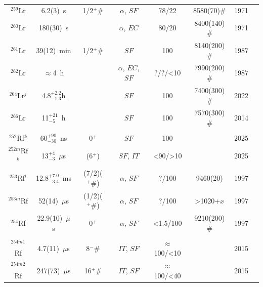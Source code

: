 \begin{center}
\begin{longtable}{c|ccccccl}
$^{259}$Lr	& 6.2(3)~s		& 1/2$^+ \#$&$\alpha$, $SF$		&78/22		& 8580(70)$\#$		&1971	&{\tiny\cite{EskolaK1971,Gregorich1992,HamiltonT1992,Holden2000,Asai2010a,Haba2020}}\\
$^{260}$Lr	& 180(30)~s		& 			&$\alpha$, $EC$		&80/20	    & 8400(140)$\#$	    &1971	&{\tiny\cite{EskolaK1971}}\\
$^{261}$Lr	& 39(12)~min	& 1/2$^+ \#$&$SF$				&100		& 8140(200)$\#$	    &1987	&{\tiny\cite{Lougheed1987,Hulet1989a,Henderson1991}}\\
$^{262}$Lr	& $\approx$4~h	& 			&$\alpha$, $EC$, $SF$	&?/?/<10& 7990(200)$\#$	    &1987	&{\tiny\cite{Lougheed1987,Hulet1989a,Devaraja2019}}\\
$^{264}$Lr$^j$	&4.8$^{+2.2}_{-1.3}$h& 	&$SF$				&100		& 7400(300)$\#$	    &2022	&{\tiny\cite{Oganessian2022c,Oganessian2022d}}\\
$^{266}$Lr	& 11$^{+21}_{-5}$~h	& 		&$SF$				&100		& 7570(300)$\#$	    &2014	&{\tiny\cite{Khuyagbaatar2014,Devaraja2019,Khuyagbaatar2019}}\\
\hline\\
$^{252}$Rf$^k$& 60$^{+90}_{-30}$~ns& 0$^+$& $SF$		    &100        &          	        &2025	&{\tiny\cite{Khuyagbaatar2025}}\\
$^{252m}$Rf$^k$& 13$^{+4}_{-3}$~$\mu$s& (6$^+$)& $SF$, $IT$ &<90/>10    &              	    &2025	&{\tiny\cite{Khuyagbaatar2025}}\\
$^{253}$Rf$^l$& 12.8$^{+7.0}_{-3.4}$~ms&(7/2)($^+ \#$)&$\alpha$, $SF$&?/100& 9460(20) 		&1997	&{\tiny\cite{Hessberger1997,Hessberger1999,Holden2000,Khuyagbaatar2021,Lopez-Martens2022,Mosat2025}}\\
$^{253m}$Rf	& 52(14)~$\mu$s &(1/2)($^+ \#$)&$\alpha$, $SF$  &?/100      &>1020+$x$          &1997	&{\tiny\cite{Hessberger1997,Hessberger1999,Holden2000,Khuyagbaatar2021,Lopez-Martens2022,Mosat2025}}\\
$^{254}$Rf	& 22.9(10)~$\mu$s&  0$^+$	&$\alpha$, $SF$		&<1.5/100	& 9210(200)$\#$	    &1997	&{\tiny\cite{Oganessian1975a,TerAkopian1975,Hessberger1997,Hessberger1999,Dragojevic2008,David2015}}\\
			&				&			&					&			& 				    &		&{\tiny\cite{Khuyagbaatar2020b,Seweryniak2023}}\\
$^{254m1}$Rf& 4.7(11)~$\mu$s&8$^- \#$&$IT$, $SF$			&$\approx$100/<10& 			    &2015	&{\tiny\cite{David2015,Khuyagbaatar2020b,Seweryniak2023}}\\
$^{254m2}$Rf	& 247(73)~$\mu$s&16$^+ \#$&$IT$, $SF$		&$\approx$100/<40& 		        &2015	&{\tiny\cite{David2015,Khuyagbaatar2020b,Seweryniak2023}}\\

\end{longtable}
\end{center}
